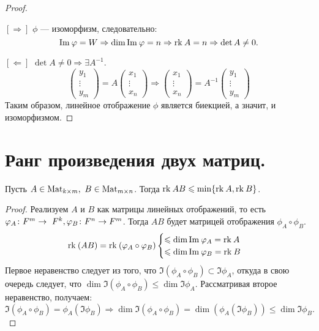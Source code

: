 \begin{proof}
\ 
\par $[\Rightarrow]$ $\phi$ --- изоморфизм, следовательно:
    \[
        \Im \phi = W \Rightarrow \dim \Im \phi = n \Rightarrow \rk A = n
        \Rightarrow \det A \neq 0.
    \]
\par $[\Leftarrow]$ $\det A \neq 0 \Rightarrow \exists A^{-1}$.
\[ \begin{pmatrix} 
    y_1\\
    \vdots\\
    y_m
\end{pmatrix} = A 
\begin{pmatrix}
x_1\\
\vdots\\
x_n
\end{pmatrix}
\Rightarrow 
\begin{pmatrix}
x_1\\
\vdots\\
x_n
\end{pmatrix} = A^{-1} \begin{pmatrix} 
    y_1\\
    \vdots\\
    y_m
\end{pmatrix}
\]
Таким образом, линейное отображение $\phi$ является биекцией, а значит, и изоморфизмом.
\end{proof}

\section{Ранг произведения двух матриц.}

\begin{Suggestion}
    Пусть $A \in \Mat_{k\times m},\ B\in \Mat_{m\times n}$. Тогда $\rk AB \leqslant \min\{\rk A, \rk B\}$.
\end{Suggestion}

\begin{proof}
    Реализуем $A$ и $B$ как матрицы линейных отображений, то есть $\phi_A\colon F^m \rightarrow~F^k,\\ \phi_B\colon F^n \rightarrow F^m$. Тогда $AB$ будет матрицей отображения $\phi_A \circ \phi_B$.
    \[
        \rk(AB) = \rk (\phi_A\circ\phi_B)
        \begin{cases}
            \leqslant \dim \Im \phi_A = \rk A \\
            \leqslant \dim \Im \phi_B = \rk B 

        \end{cases}
    \]
Первое неравенство следует из того, что $\Im(\phi_A\circ \phi_B) \subset \Im \phi_A$, откуда в свою очередь следует, что $\dim \Im (\phi_A\circ \phi_B) \leqslant \dim \Im \phi_A$. Рассматривая второе неравенство, получаем: 
    \[
        \Im (\phi_A\circ \phi_B) = \phi_A(\Im \phi_B) \Rightarrow \dim \Im (\phi_A\circ \phi_B)= \dim(\phi_A(\Im\phi_B)) \leqslant \dim\Im \phi_B.
    \]
\end{proof}

